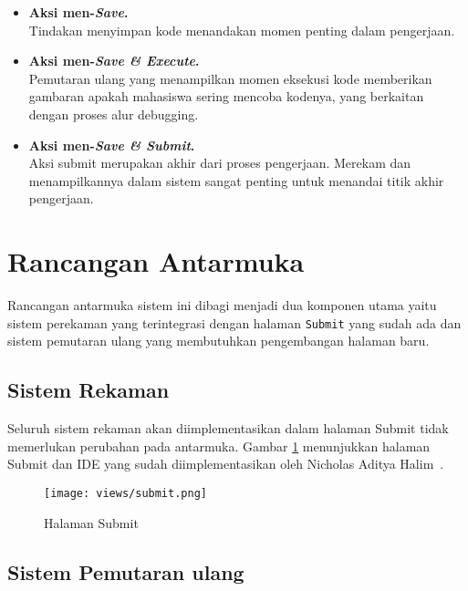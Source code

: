 \begin{itemize}
    \item \textbf{Aksi men-\textit{Save}.} \\
    Tindakan menyimpan kode menandakan momen penting dalam pengerjaan.

    \item \textbf{Aksi men-\textit{Save \& Execute}.} \\
    Pemutaran ulang yang menampilkan momen eksekusi kode memberikan gambaran apakah mahasiswa sering mencoba kodenya, yang berkaitan dengan proses alur  debugging.

    \item \textbf{Aksi men-\textit{Save \& Submit}.} \\
    Aksi submit merupakan akhir dari proses pengerjaan. Merekam dan menampilkannya dalam sistem sangat penting untuk menandai titik akhir pengerjaan.
\end{itemize}

\section{Rancangan Antarmuka}

Rancangan antarmuka sistem ini dibagi menjadi dua komponen utama yaitu sistem perekaman yang terintegrasi dengan halaman \verb|Submit| yang sudah ada dan sistem pemutaran ulang yang membutuhkan pengembangan halaman baru.

\subsection{Sistem Rekaman}
\label{sub:4:1:rekaman}

Seluruh sistem rekaman akan diimplementasikan dalam halaman Submit tidak memerlukan perubahan pada antarmuka. Gambar \ref{fig:4:1:submit} menunjukkan halaman Submit dan IDE yang sudah diimplementasikan oleh Nicholas Aditya Halim~\cite{nicholas:sharif}.

\vspace{0.75cm}

\begin{figure}[H]
    \centering
    \texttt{[image: views/submit.png]}
    \caption{Halaman Submit}
    \label{fig:4:1:submit}
\end{figure}

\subsection{Sistem Pemutaran ulang}
\label{sub:4:1:pemutaranulang}

